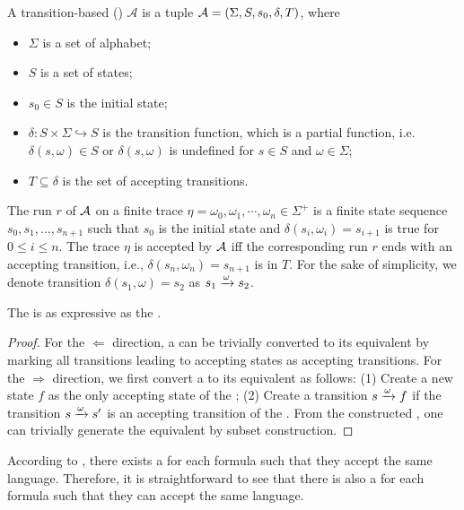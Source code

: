 \begin{definition}\label{def:tdfa}
A transition-based \dfa (\tdfa) $\mathcal{A}$ is a tuple $\mathcal{A} = (\Sigma,S,s_0,\delta,T)$, where 
\begin{itemize}
    \item $\Sigma$ is a set of alphabet;
    \item $S$ is a set of states;
    \item $s_0\in S$ is the initial state;
    \item $\delta:S\times\Sigma\hookrightarrow S$ is the transition function, which is a partial function, i.e. $\delta (s, \omega)\in S$ or $\delta (s, \omega)$ is undefined for $s\in S$ and $\omega\in {\Sigma}$;
    \item $T \subseteq \delta$ is the set of accepting transitions.
\end{itemize}
\end{definition}

The run $r$ of $\mathcal{A}$ on a finite trace $\eta=\omega_0, \omega_1,\cdots, \omega_n \in \Sigma^+$ is a finite state sequence $s_0,s_1,\ldots,s_{n+1}$ such that $s_0$ is the initial state and $\delta (s_i, \omega_i) = s_{i+1}$ is true for $0\leq i \leq n$.
The trace $\eta$ is accepted by $\mathcal{A}$ iff the corresponding run $r$ ends with an accepting transition, i.e., $\delta (s_n, \omega_n) = s_{n+1}$ is in $T$. For the sake of simplicity, we denote transition $\delta (s_1, \omega) = s_2$ as $s_1\xrightarrow[]{\omega}s_2$.

\begin{lemma}\label{lem:tdfa}
The \tdfa is as expressive as the \dfa.
\end{lemma}
\begin{proof}
	For the $\Leftarrow$ direction, a \dfa can be trivially converted to its equivalent \tdfa by marking all transitions leading to accepting states as accepting transitions. For the $\Rightarrow$ direction, we first convert a \tdfa to its equivalent \nfa as follows: (1) Create a new state $f$ as the only accepting state of the \nfa; (2) Create a transition $s\xrightarrow[]{\omega}f$ if the transition $s\xrightarrow[]{\omega}s'$ is an accepting transition of the \tdfa. From the constructed \nfa, one can trivially generate the equivalent \dfa by subset construction. 
\end{proof}


According to \cite{GV13}, there exists a \dfa for each \ltlf formula such that they accept the same language. Therefore, it is straightforward to see that there is also a \tdfa for each \ltlf formula such that they can accept the same language. 

